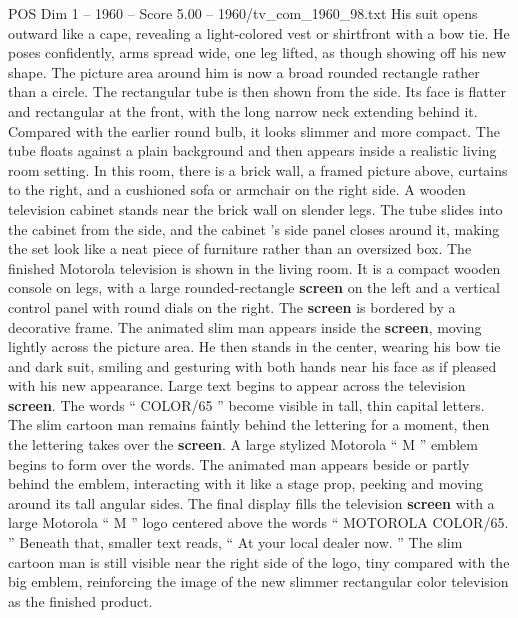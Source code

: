 \begin{textsample}{POS Dim 1 – 1960 – Score 5.00 – 1960/tv\_com\_1960\_98.txt}
His suit opens outward like a cape, revealing a light-colored vest or shirtfront with a bow tie.
He poses confidently, arms spread wide, one leg lifted, as though showing off his new shape.
The picture area around him is now a broad rounded rectangle rather than a circle.
The rectangular tube is then shown from the side.
Its face is flatter and rectangular at the front, with the long narrow neck extending behind it.
Compared with the earlier round bulb, it looks slimmer and more compact.
The tube floats against a plain background and then appears inside a realistic living room setting.
In this room, there is a brick wall, a framed picture above, curtains to the right, and a cushioned sofa or armchair on the right side.
A wooden television cabinet stands near the brick wall on slender legs.
The tube slides into the cabinet from the side, and the cabinet ’s side panel closes around it, making the set look like a neat piece of furniture rather than an oversized box.
The finished Motorola television is shown in the living room.
It is a compact wooden console on legs, with a large rounded-rectangle \textbf{screen} on the left and a vertical control panel with round dials on the right.
The \textbf{screen} is bordered by a decorative frame.
The animated slim man appears inside the \textbf{screen}, moving lightly across the picture area.
He then stands in the center, wearing his bow tie and dark suit, smiling and gesturing with both hands near his face as if pleased with his new appearance.
Large text begins to appear across the television \textbf{screen}.
The words “ COLOR/65 ” become visible in tall, thin capital letters.
The slim cartoon man remains faintly behind the lettering for a moment, then the lettering takes over the \textbf{screen}.
A large stylized Motorola “ M ” emblem begins to form over the words.
The animated man appears beside or partly behind the emblem, interacting with it like a stage prop, peeking and moving around its tall angular sides.
The final display fills the television \textbf{screen} with a large Motorola “ M ” logo centered above the words “ MOTOROLA COLOR/65. ” Beneath that, smaller text reads, “ At your local dealer now. ” The slim cartoon man is still visible near the right side of the logo, tiny compared with the big emblem, reinforcing the image of the new slimmer rectangular color television as the finished product.

\end{textsample}
